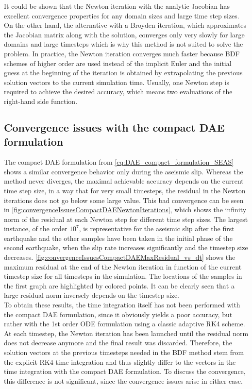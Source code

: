 It could be shown that the Newton iteration with the analytic Jacobian has excellent convergence properties for any domain sizes and large time step sizes. On the other hand, the alternative with a Broyden iteration, which approximates the Jacobian matrix along with the solution, converges only very slowly for large domains and large timesteps which is why this method is not suited to solve the problem. In practice, the  Newton iteration converges much faster because BDF schemes of higher order are used instead of the implicit Euler and the initial guess at the beginning of the iteration is obtained by extrapolating the previous solution vectors to the current simulation time. Usually, one Newton step is required to achieve the desired accuracy, which means two evaluations of the right-hand side function. \\

\subsection{Convergence issues with the compact DAE formulation}
The compact DAE formulation from \autoref{eq:DAE_compact_formulation_SEAS} shows a similar convergence behavior only during the aseismic slip. Whereas the method never diverges, the maximal achievable accuracy depends on the current time step size, in a way that for very small timesteps, the residual in the Newton iterations does not go below some large value. This bad convergence can be seen in \autoref{fig:convergenceIssuesCompactDAENewtonIterations}, which shows the infinity norm of the residual at each Newton step for different time step sizes. The largest instance, of the order $10^7$, is representative for the aseismic slip after the first earthquake and the other samples have been taken in the initial phase of the second earthquake, when the slip rate increases significantly and the timestep size decreases. \autoref{fig:convergenceIssuesCompactDAEMaxResidual_vs_dt} shows the maximum residual at the end of the Newton iteration in function of the current timestep size for all timesteps in the simulation. The locations of the samples in the first graph are highlighted by colored points. It can be clearly seen that a large residual norm inversely depends on the timestep size. \\ 
To obtain these results, the time integration itself has not been performed with the compact DAE formulation, since it obviously yields a poor accuracy, but rather with the 1st order ODE formulation using a classic adaptive RK4 scheme. At each timestep, the Newton iteration has been launched until the residual norm does not decrease anymore and the final result was discarded. Therefore, the solution vectors at the previous timesteps needed in the BDF method stem from the explicit RK4 time integration and thus slightly differ to the vectors in the time integration with the compact DAE formulation. To discuss the convergence, this difference is not significant, since the convergence issues arise in either case. \\

